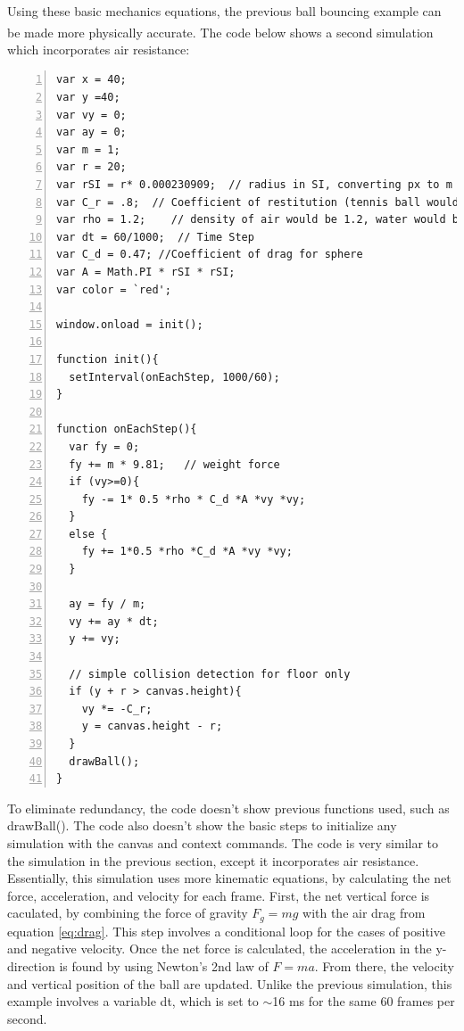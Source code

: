 Using these basic mechanics equations, the previous ball bouncing example can be made more physically accurate.\textsuperscript{\cite{jsbook}}  The code below shows a second simulation which incorporates air resistance:

\vspace{2mm}
\begin{lstlisting}[breaklines=true, frame=single, numbers=left, caption=More advanced ball bouncing simulation, label=lst:ballbounce2]
var x = 40;
var y =40;
var vy = 0;
var ay = 0;
var m = 1;
var r = 20;
var rSI = r* 0.000230909;  // radius in SI, converting px to m
var C_r = .8;  // Coefficient of restitution (tennis ball would be .8)
var rho = 1.2;    // density of air would be 1.2, water would be 1000
var dt = 60/1000;  // Time Step
var C_d = 0.47; //Coefficient of drag for sphere
var A = Math.PI * rSI * rSI;
var color = `red';

window.onload = init();
  
function init(){
  setInterval(onEachStep, 1000/60);
}

function onEachStep(){ 
  var fy = 0;
  fy += m * 9.81;   // weight force
  if (vy>=0){
    fy -= 1* 0.5 *rho * C_d *A *vy *vy; 
  } 
  else {
    fy += 1*0.5 *rho *C_d *A *vy *vy;
  }

  ay = fy / m;
  vy += ay * dt;
  y += vy;
  
  // simple collision detection for floor only
  if (y + r > canvas.height){ 
    vy *= -C_r; 
    y = canvas.height - r;  
  }
  drawBall();
}
\end{lstlisting}

To eliminate redundancy, the code doesn't show previous functions used, such as drawBall().  The code also doesn't show the basic steps to initialize any simulation with the canvas and context commands.  The code is very similar to the simulation in the previous section, except it incorporates air resistance.  Essentially, this simulation uses more kinematic equations, by calculating the net force, acceleration, and velocity for each frame.  First, the net vertical force is caculated, by combining the force of gravity $F_g = mg$ with the air drag from equation \ref{eq:drag}.  This step involves a conditional loop for the cases of positive and negative velocity.  Once the net force is calculated, the acceleration in the y-direction is found by using Newton's 2nd law of $F = ma$.  From there, the velocity and vertical position of the ball are updated.  Unlike the previous simulation, this example involves a variable dt, which is set to $\sim$16 ms for the same 60 frames per second.   


